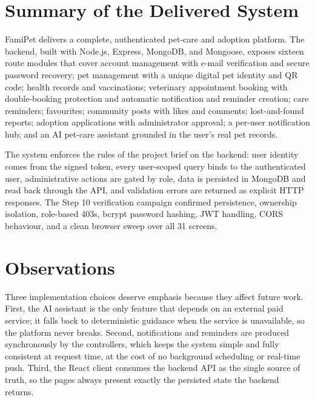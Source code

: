 
\section{Summary of the Delivered System}

FamiPet delivers a complete, authenticated pet-care and adoption platform. The
backend, built with Node.js, Express, MongoDB, and Mongoose, exposes sixteen
route modules that cover account management with e-mail verification and secure
password recovery; pet management with a unique digital pet identity and QR
code; health records and vaccinations; veterinary appointment booking with
double-booking protection and automatic notification and reminder creation;
care reminders; favourites; community posts with likes and comments; lost-and-found
reports; adoption applications with administrator approval; a per-user
notification hub; and an AI pet-care assistant grounded in the user's real pet
records.

The system enforces the rules of the project brief on the backend: user identity
comes from the signed token, every user-scoped query binds to the authenticated
user, administrative actions are gated by role, data is persisted in MongoDB
and read back through the API, and validation errors are returned as explicit
HTTP responses. The Step 10 verification campaign confirmed persistence,
ownership isolation, role-based 403s, bcrypt password hashing, JWT handling,
CORS behaviour, and a clean browser sweep over all 31 screens.

\section{Observations}

Three implementation choices deserve emphasis because they affect future work.
First, the AI assistant is the only feature that depends on an external paid
service; it falls back to deterministic guidance when the service is
unavailable, so the platform never breaks. Second, notifications and reminders
are produced synchronously by the controllers, which keeps the system simple and
fully consistent at request time, at the cost of no background scheduling or
real-time push. Third, the React client consumes the backend API as the single
source of truth, so the pages always present exactly the persisted state the
backend returns.

